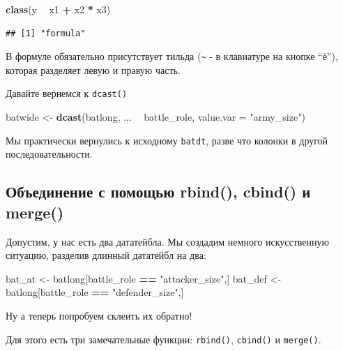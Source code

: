 \documentclass[]{book}
\newenvironment{Shaded}{\begin{snugshade}}{\end{snugshade}}
\newcommand{\KeywordTok}[1]{\textcolor[rgb]{0.13,0.29,0.53}{\textbf{#1}}}
\newcommand{\DataTypeTok}[1]{\textcolor[rgb]{0.13,0.29,0.53}{#1}}
\newcommand{\StringTok}[1]{\textcolor[rgb]{0.31,0.60,0.02}{#1}}
\newcommand{\OperatorTok}[1]{\textcolor[rgb]{0.81,0.36,0.00}{\textbf{#1}}}
\newcommand{\NormalTok}[1]{#1}
\begin{document}
\begin{Shaded}
\begin{Highlighting}[]
\KeywordTok{class}\NormalTok{(y }\OperatorTok{~}\StringTok{ }\NormalTok{x1 }\OperatorTok{+}\StringTok{ }\NormalTok{x2 }\OperatorTok{*}\StringTok{ }\NormalTok{x3)}
\end{Highlighting}
\end{Shaded}

\begin{verbatim}
## [1] "formula"
\end{verbatim}

В формуле обязательно присутствует тильда (\texttt{\textasciitilde{}} -
в клавиатуре на кнопке ``ё''), которая разделяет левую и правую часть.

Давайте вернемся к \texttt{dcast()}

\begin{Shaded}
\begin{Highlighting}[]
\NormalTok{batwide <-}\StringTok{ }\KeywordTok{dcast}\NormalTok{(batlong,  }
\NormalTok{                 ... }\OperatorTok{~}\StringTok{ }\NormalTok{battle_role, }
                 \DataTypeTok{value.var =} \StringTok{"army_size"}\NormalTok{)}
\end{Highlighting}
\end{Shaded}

Мы практически вернулись к исходному \texttt{batdt}, разве что колонки в
другой последовательности.

\subsection{Объединение с помощью rbind(), cbind() и
merge()}\label{join_merge}

Допустим, у нас есть два дататейбла. Мы создадим немного искусственную
ситуацию, разделив длинный дататейбл на два:

\begin{Shaded}
\begin{Highlighting}[]
\NormalTok{bat_at <-}\StringTok{ }\NormalTok{batlong[battle_role }\OperatorTok{==}\StringTok{ "attacker_size"}\NormalTok{,]}
\NormalTok{bat_def <-}\StringTok{ }\NormalTok{batlong[battle_role }\OperatorTok{==}\StringTok{ "defender_size"}\NormalTok{,]}
\end{Highlighting}
\end{Shaded}

Ну а теперь попробуем склеить их обратно!

Для этого есть три замечательные функции: \texttt{rbind()},
\texttt{cbind()} и \texttt{merge()}.
\end{document}
